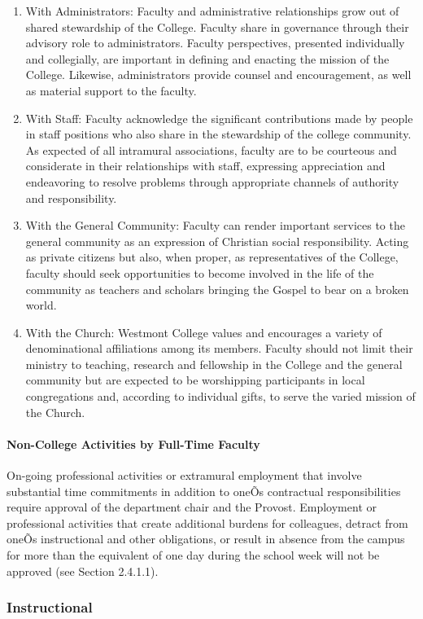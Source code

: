 \documentclass[letterpaper, 11pt]{article}
\begin{document}
\begin{enumerate}[label=\alph*)]
					\item{With Administrators:  Faculty and administrative relationships grow out of shared stewardship of the College.  Faculty share in governance through their advisory role to administrators.  Faculty perspectives, presented individually and collegially, are important in defining and enacting the mission of the College.  Likewise, administrators provide counsel and encouragement, as well as material support to the faculty.}
					\item{With Staff:  Faculty acknowledge the significant contributions made by people in staff positions who also share in the stewardship of the college community.  As expected of all intramural associations, faculty are to be courteous and considerate in their relationships with staff, expressing appreciation and endeavoring to resolve problems through appropriate channels of authority and responsibility.}
					\item{With the General Community:  Faculty can render important services to the general community as an expression of Christian social responsibility.  Acting as private citizens but also, when proper, as representatives of the College, faculty should seek opportunities to become involved in the life of the community as teachers and scholars bringing the Gospel to bear on a broken world.}
					\item{With the Church:  Westmont College values and encourages a variety of denominational affiliations among its members.  Faculty should not limit their ministry to teaching, research and fellowship in the College and the general community but are expected to be worshipping participants in local congregations and, according to individual gifts, to serve the varied mission of the Church.}
				\end{enumerate}
			\paragraph{Non-College Activities by Full-Time Faculty}
				On-going professional activities or extramural employment that involve substantial time commitments in addition to oneÕs contractual responsibilities require approval of the department chair and the Provost.  Employment or professional activities that create additional burdens for colleagues, detract from oneÕs instructional and other obligations, or result in absence from the campus for more than the equivalent of one day during the school week will not be approved (see Section 2.4.1.1).
		\subsubsection{Instructional}
\end{document}
